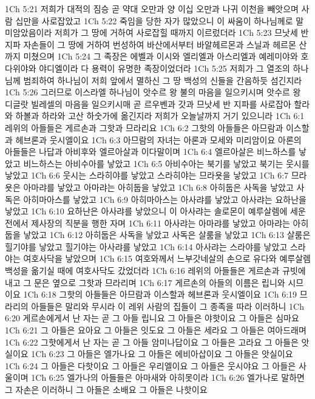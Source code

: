 1Ch 5:21  저희가 대적의 짐승 곧 약대 오만과 양 이십 오만과 나귀 이천을 빼앗으며 사람 십만을 사로잡았고
1Ch 5:22  죽임을 당한 자가 많았으니 이 싸움이 하나님께로 말미암았음이라 저희가 그 땅에 거하여 사로잡힐 때까지 이르렀더라
1Ch 5:23  므낫세 반 지파 자손들이 그 땅에 거하여 번성하여 바산에서부터 바알헤르몬과 스닐과 헤르몬 산까지 미쳤으며
1Ch 5:24  그 족장은 에벨과 이시와 엘리엘과 아스리엘과 예레미야와 호다위야와 야디엘이라 다 용력이 유명한 족장이었더라
1Ch 5:25  저희가 그 열조의 하나님께 범죄하여 하나님이 저희 앞에서 멸하신 그 땅 백성의 신들을 간음하듯 섬긴지라
1Ch 5:26  그러므로 이스라엘 하나님이 앗수르 왕 불의 마음을 일으키시며 앗수르 왕 디글랏 빌레셀의 마음을 일으키시매 곧 르우벤과 갓과 므낫세 반 지파를 사로잡아 할라와 하볼과 하라와 고산 하숫가에 옮긴지라 저희가 오늘날까지 거기 있으니라
1Ch 6:1  레위의 아들들은 게르손과 그핫과 므라리요
1Ch 6:2  그핫의 아들들은 아므람과 이스할과 헤브론과 웃시엘이요
1Ch 6:3  아므람의 자녀는 아론과 모세와 미리암이요 아론의 아들들은 나답과 아비후와 엘르아살과 이다말이며
1Ch 6:4  엘르아살은 비느하스를 낳았고 비느하스는 아비수아를 낳았고
1Ch 6:5  아비수아는 북기를 낳았고 북기는 웃시를 낳았고
1Ch 6:6  웃시는 스라히야를 낳았고 스라히야는 므라욧을 낳았고
1Ch 6:7  므라욧은 아마랴를 낳았고 아마랴는 아히둡을 낳았고
1Ch 6:8  아히둡은 사독을 낳았고 사독은 아히마아스를 낳았고
1Ch 6:9  아히마아스는 아사랴를 낳았고 아사랴는 요하난을 낳았고
1Ch 6:10  요하난은 아사랴를 낳았으니 이 아사랴는 솔로몬이 예루살렘에 세운 전에서 제사장의 직분을 행한 자며
1Ch 6:11  아사랴는 아마랴를 낳았고 아마랴는 아히둡을 낳았고
1Ch 6:12  아히둡은 사독을 낳았고 사독은 살룸을 낳았고
1Ch 6:13  살룸은 힐기야를 낳았고 힐기야는 아사랴를 낳았고
1Ch 6:14  아사랴는 스라야를 낳았고 스라야는 여호사닥을 낳았으며
1Ch 6:15  여호와께서 느부갓네살의 손으로 유다와 예루살렘 백성을 옮기실 때에 여호사닥도 갔었더라
1Ch 6:16  레위의 아들들은 게르손과 규빗에 내고 그 문은 옆으로 그핫과 므라리며
1Ch 6:17  게르손의 아들의 이름은 립니와 시므이요
1Ch 6:18  그핫의 아들들은 아므람과 이스할과 헤브론과 웃시엘이요
1Ch 6:19  므라리의 아들들은 말리와 무시라 이 레위 사람의 집들이 그 종족을 따라 이러하니
1Ch 6:20  게르손에게서 난 자는 곧 그 아들 립니요 그 아들은 야핫이요 그 아들은 심마요
1Ch 6:21  그 아들은 요아요 그 아들은 잇도요 그 아들은 세라요 그 아들은 여아드래며
1Ch 6:22  그핫에게서 난 자는 곧 그 아들 암미나답이요 그 아들은 고라요 그 아들은 앗실이요
1Ch 6:23  그 아들은 엘가나요 그 아들은 에비아삽이요 그 아들은 앗실이요
1Ch 6:24  그 아들은 다핫이요 그 아들은 우리엘이요 그 아들은 웃시야요 그 아들은 사울이며
1Ch 6:25  엘가나의 아들들은 아마새와 아히못이라
1Ch 6:26  엘가나로 말하면 그 자손은 이러하니 그 아들은 소배요 그 아들은 나핫이요
